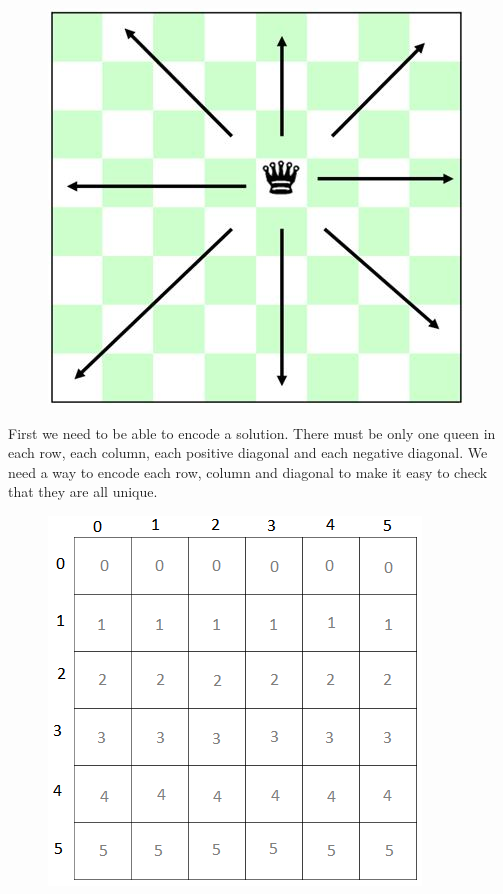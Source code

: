 \documentclass[11pt,oneside]{book}
\makeatletter
\def\maxwidth#1{\ifdim\Gin@nat@width>#1 #1\else\Gin@nat@width\fi}
\makeatother
\begin{document}
\vspace{5px}\begin{figure}[H]\centering
        \includegraphics[width=0.66\maxwidth{\textwidth}]{nqueen.jpg}
        \end{figure}

First we need to be able to encode a solution. There must be only one queen in each row, each column, each positive diagonal and each negative diagonal. We need a way to encode each row, column and diagonal to make it easy to check that they are all unique.

\vspace{5px}\begin{figure}[H]\centering
        \includegraphics[width=0.66\maxwidth{\textwidth}]{nqueen3.png}
        \end{figure}
\end{document}
